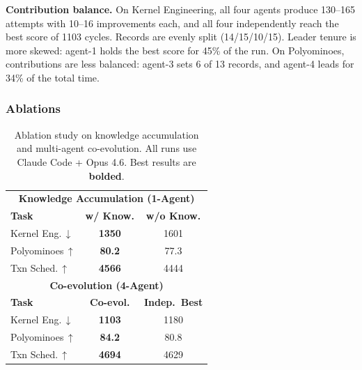 \textbf{Contribution balance.}
On Kernel Engineering, all four agents produce 130--165 attempts with 10--16 improvements each, and all four independently reach the best score of 1103 cycles. Records are evenly split (14/15/10/15). Leader tenure is more skewed: agent-1 holds the best score for 45\% of the run. On Polyominoes, contributions are less balanced: agent-3 sets 6 of 13 records, and agent-4 leads for 34\% of the total time.

\subsubsection{Ablations}
\label{sec:ablations}

\renewcommand{\arraystretch}{0.97}
\begin{table}
\vspace{-20pt}
\caption{Ablation study on knowledge accumulation and multi-agent co-evolution. All runs use Claude Code + Opus 4.6. Best results are \textbf{bolded}.}
\label{tab:ablations}
\centering
\scriptsize
\setlength{\tabcolsep}{3pt}

\begin{tabular}{lcc}
\toprule

\multicolumn{3}{c}{\textbf{Knowledge Accumulation (1-Agent)}} \\

\textbf{Task} & \textbf{w/ Know.} & \textbf{w/o Know.} \\
\midrule
Kernel Eng.\,$\downarrow$  & \textbf{1350} & 1601 \\
Polyominoes\,$\uparrow$    & \textbf{80.2} & 77.3 \\
Txn Sched.\,$\uparrow$     & \textbf{4566} & 4444 \\

\midrule


\multicolumn{3}{c}{\textbf{Co-evolution (4-Agent)}} \\
\textbf{Task} & \textbf{Co-evol.} & \textbf{Indep.\ Best} \\
\midrule
Kernel Eng.\,$\downarrow$  & \textbf{1103} & 1180 \\
Polyominoes\,$\uparrow$    & \textbf{84.2} & 80.8 \\
Txn Sched.\,$\uparrow$     & \textbf{4694} & 4629 \\

\bottomrule
\end{tabular}
\vspace{-25pt}
\end{table}

